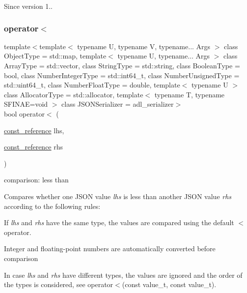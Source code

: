\begin{DoxySince}{Since}
version 1.. 
\end{DoxySince}
\mbox{\label{classnlohmann_1_1basic__json_aacd442b66140c764c594ac8ad7dfd5b3}} 
\subsubsection{\texorpdfstring{operator$<$}{operator<}}
{\footnotesize\ttfamily template$<$template$<$ typename U, typename V, typename... Args $>$ class Object\+Type = std\+::map, template$<$ typename U, typename... Args $>$ class Array\+Type = std\+::vector, class String\+Type  = std\+::string, class Boolean\+Type  = bool, class Number\+Integer\+Type  = std\+::int64\+\_\+t, class Number\+Unsigned\+Type  = std\+::uint64\+\_\+t, class Number\+Float\+Type  = double, template$<$ typename U $>$ class Allocator\+Type = std\+::allocator, template$<$ typename T, typename S\+F\+I\+N\+A\+E=void $>$ class J\+S\+O\+N\+Serializer = adl\+\_\+serializer$>$ \\
bool operator$<$ (\begin{DoxyParamCaption}\item[{\mbox{\hyperlink{classnlohmann_1_1basic__json_a4057c5425f4faacfe39a8046871786ca}{const\+\_\+reference}}}]{lhs,  }\item[{\mbox{\hyperlink{classnlohmann_1_1basic__json_a4057c5425f4faacfe39a8046871786ca}{const\+\_\+reference}}}]{rhs }\end{DoxyParamCaption})\hspace{0.3cm}{\ttfamily [friend]}}



comparison\+: less than 

Compares whether one J\+S\+ON value {\itshape lhs} is less than another J\+S\+ON value {\itshape rhs} according to the following rules\+:
\begin{DoxyItemize}
\item If {\itshape lhs} and {\itshape rhs} have the same type, the values are compared using the default {\ttfamily $<$} operator.
\item Integer and floating-\/point numbers are automatically converted before comparison
\item In case {\itshape lhs} and {\itshape rhs} have different types, the values are ignored and the order of the types is considered, see operator$<$(const value\+\_\+t, const value\+\_\+t).
\end{DoxyItemize}


